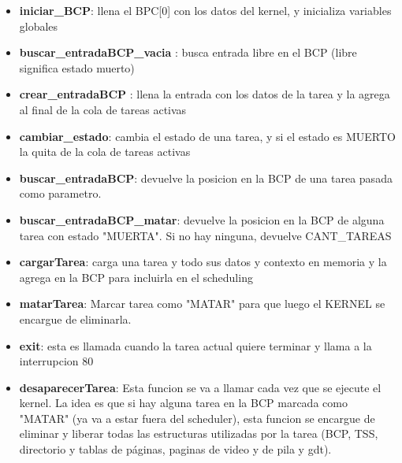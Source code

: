 \documentclass[11pt, a4paper]{article}
\begin{document}
				\begin{itemize}
	
                  
                  \item \textbf{iniciar\_BCP}: llena el BPC[0] con los datos del kernel, y inicializa variables globales

          
                  \item \textbf{buscar\_entradaBCP\_vacia }: busca entrada libre en el BCP (libre significa estado muerto)
                 
                  \item \textbf{crear\_entradaBCP }: llena la entrada con los datos de la tarea y la agrega al final de la cola de tareas activas
   
                  \item \textbf{cambiar\_estado}: cambia el estado de una tarea, y si el estado es MUERTO la quita de la cola de tareas activas
   
                  \item \textbf{buscar\_entradaBCP}: devuelve la posicion en la BCP de una tarea pasada como parametro.
     
                  \item \textbf{buscar\_entradaBCP\_matar}: devuelve la posicion en la BCP de alguna tarea con estado "MUERTA". Si no hay ninguna, devuelve CANT\_TAREAS

                  
                  \item \textbf{cargarTarea}: carga una tarea y todo sus datos y contexto en memoria y la agrega en la BCP para incluirla en el scheduling

                  
                  \item \textbf{matarTarea}: Marcar tarea como "MATAR" para que luego el KERNEL se encargue de eliminarla. 
                                   
                  \item \textbf{exit}:  esta es llamada cuando la tarea actual quiere terminar y llama a la interrupcion 80

                  
                  \item \textbf{desaparecerTarea}: Esta funcion se va a llamar cada vez que se ejecute el kernel. La idea es que si hay alguna tarea en la BCP marcada como "MATAR" (ya va a estar fuera del scheduler), esta funcion se encargue de eliminar y liberar todas las estructuras utilizadas por la tarea (BCP, TSS, directorio y tablas de páginas, paginas de video y de pila y gdt).

                  	
		
				\end{itemize}
\end{document}
